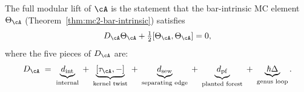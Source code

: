 \begin{definition}
\label{def:ambient-master-equation}
The full modular lift of $\cA$ is the statement
that the bar-intrinsic MC element $\Theta_{\cA}$
(Theorem~\ref{thm:mc2-bar-intrinsic}) satisfies
\begin{equation}
\label{eq:ambient-master-equation}
D_{\cA}\Theta_{\cA}
+ \tfrac12[\Theta_{\cA},\Theta_{\cA}] = 0,
\end{equation}
where the five pieces of $D_{\cA}$ are:
\begin{equation}
\label{eq:ambient-differential}
D_{\cA}
\;=\;
\underbrace{d_{\mathrm{int}}}_{\text{internal}}
\;+\;
\underbrace{[\tau_{\cA},-]}_{\text{kernel twist}}
\;+\;
\underbrace{d_{\mathrm{sew}}}_{\text{separating edge}}
\;+\;
\underbrace{d_{\mathrm{pf}}}_{\text{planted forest}}
\;+\;
\underbrace{\hbar\Delta}_{\text{genus loop}}.
\end{equation}
\end{definition}

